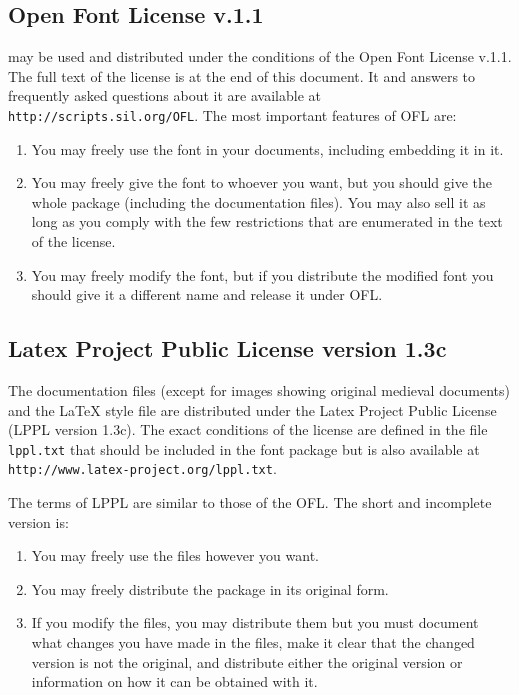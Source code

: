 \documentclass[a4paper]{article}
\begin{document}
\subsection{Open Font License v.1.1}


\Aboensis{} may be used and distributed under the conditions of the
Open Font License v.1.1. The full text of the license is at the end of
this document. It and answers to frequently asked questions about it
are available at \texttt{http://scripts.sil.org/OFL}. The most
important features of OFL are:
\begin{enumerate}
\item You may freely use the font in your documents, including
  embedding it in it.

\item You may freely give the font to whoever you want, but you should
  give the whole package (including the documentation files). You may
  also sell it as long as you comply with the few restrictions that
  are enumerated in the text of the license.

\item You may freely modify the font, but if you distribute the
  modified font you should give it a different name and release it
  under OFL.
\end{enumerate}


\subsection{Latex Project Public License version 1.3c} 

The documentation files (except for images showing original medieval
documents) and the LaTeX style file are distributed under the Latex
Project Public License (LPPL version 1.3c). The exact conditions of
the license are defined in the file \texttt{lppl.txt} that should be
included in the font package but is also available at
\texttt{http://www.latex-project.org/lppl.txt}.

The terms of LPPL are similar to those of the OFL. The short and
incomplete version is:
\begin{enumerate}
\item You may freely use the files however you want. 

\item You may freely distribute the package in its original form. 

\item If you modify the files, you may distribute them but you must
  document what changes you have made in the files, make it clear that
  the changed version is not the original, and distribute either the
  original version or information on how it can be obtained with it.
\end{enumerate}
\end{document}
